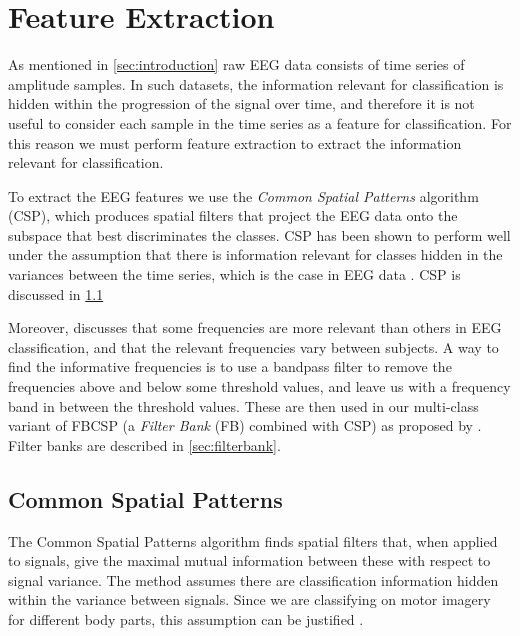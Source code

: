 \section{Feature Extraction}\label{sec:feature-extraction}
As mentioned in \cref{sec:introduction} raw EEG data consists of time series of amplitude samples. In such datasets, the information relevant for classification is hidden within the progression of the signal over time, and therefore it is not useful to consider each sample in the time series as a feature for classification. For this reason we must perform feature extraction to extract the information relevant for classification. 

To extract the EEG features we use the \emph{Common Spatial Patterns} algorithm (CSP), which produces spatial filters that project the EEG data onto the subspace that best discriminates the classes.
CSP has been shown to perform well under the assumption that there is information relevant for classes hidden in the variances between the time series, which is the case in EEG data \cite{ang2012filter}. CSP is discussed in \cref{sec:csp}

Moreover, \cite{ang2012filter} discusses that some frequencies are more relevant than others in EEG classification, and that the relevant frequencies vary between subjects. A way to find the informative frequencies is to use a bandpass filter to remove the frequencies above and below some threshold values, and leave us with a frequency band in between the threshold values. These are then used in our multi-class variant of FBCSP (a \emph{Filter Bank} (FB) combined with CSP) as proposed by \citet{ang2012filter}. Filter banks are described in \cref{sec:filterbank}.

\subsection{Common Spatial Patterns}\label{sec:csp}
The Common Spatial Patterns algorithm finds spatial filters that, when applied to signals, give the maximal mutual information between these with respect to signal variance. The method assumes there are classification information hidden within the variance between signals. Since we are classifying on motor imagery for different body parts, this assumption can be justified \citep{blankertz2008optimizing}.

